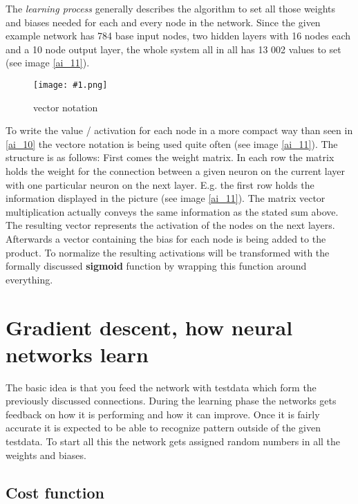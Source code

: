 \documentclass{article}
\newcommand{\lbl}[1]{(see image \ref{#1})}
\newcommand{\img}[1]{
	\centering
	\texttt{[image: \#1.png]}
	\label{#1}
}
\begin{document}
The \textit{learning process} generally describes the algorithm to set all those weights and biases needed for each and every node in the network. Since the given example network has 784 base input nodes, two hidden layers with 16 nodes each and a 10 node output layer, the whole system all in all has 13 002 values to set \lbl{ai_11}.

\begin{figure}[!htbp]
\img{ai_12}
\caption{vector notation}
\end{figure}

To write the value / activation for each node in a more compact way than seen in \ref{ai_10} the vectore notation is being used quite often \lbl{ai_11}. The structure is as follows: First comes the weight matrix. In each row the matrix holds the weight for the connection between a given neuron on the current layer with one particular neuron on the next layer. E.g. the first row holds the information displayed in the picture \lbl{ai_11}. The matrix vector multiplication actually conveys the same information as the stated sum above. The resulting vector represents the activation of the nodes on the next layers. Afterwards a vector containing the bias for each node is being added to the product. To normalize the resulting activations will be transformed with the formally discussed \textbf{sigmoid} function by wrapping this function around everything.





\section{Gradient descent, how neural networks learn}

The basic idea is that you feed the network with testdata which form the previously discussed connections. During the learning phase the networks gets feedback on how it is performing and how it can improve. Once it is fairly accurate it is expected to be able to recognize pattern outside of the given testdata. To start all this the network gets assigned random numbers in all the weights and biases.


\subsection{Cost function}
\end{document}
